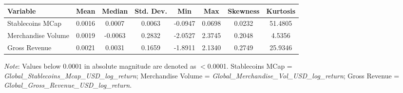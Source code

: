 \begin{tabular}{lccccccc}
  \toprule
  \textbf{Variable} & \textbf{Mean} & \textbf{Median} & \textbf{Std. Dev.} & \textbf{Min} & \textbf{Max} & \textbf{Skewness} & \textbf{Kurtosis} \\ 
  \midrule
  Stablecoins MCap & 0.0016 & 0.0007 & 0.0063 & -0.0947 & 0.0698 & 0.0232 & 51.4805 \\ 
  Merchandise Volume & 0.0019 & -0.0063 & 0.2832 & -2.0527 & 2.3745 & 0.2048 & 4.5356 \\ 
  Gross Revenue & 0.0021 & 0.0031 & 0.1659 & -1.8911 & 2.1340 & 0.2749 & 25.9346 \\ 
  \bottomrule
\end{tabular}
\par\vspace{4pt}
\begin{minipage}{\linewidth}
  \footnotesize \textit{Note}: Values below $0.0001$ in absolute magnitude are denoted as $<$0.0001. Stablecoins MCap = \textit{Global\_Stablecoins\_Mcap\_USD\_log\_return}; Merchandise Volume = \textit{Global\_Merchandise\_Vol\_USD\_log\_return}; Gross Revenue = \textit{Global\_Gross\_Revenue\_USD\_log\_return}.
\end{minipage}